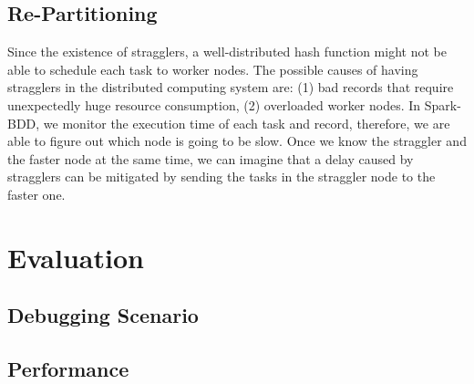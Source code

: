 \documentclass{acm_proc_article-sp}
\begin{document}
\subsection{Re-Partitioning}

Since the existence of stragglers, a well-distributed hash function might not be able to schedule each task to worker nodes. The possible causes of having stragglers in the distributed computing system are: (1) bad records that require unexpectedly huge resource consumption, (2) overloaded worker nodes. In Spark-BDD, we monitor the execution time of each task and record, therefore, we are able to figure out which node is going to be slow. Once we know the straggler and the faster node at the same time, we can imagine that a delay caused by stragglers can be mitigated by sending the tasks in the straggler node to the faster one. 

\section{Evaluation}
\subsection{Debugging Scenario}


\subsection{Performance}
\end{document}
